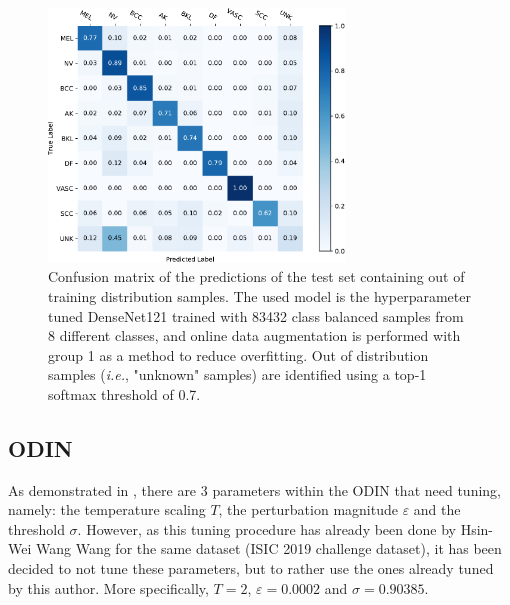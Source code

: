         \begin{figure}[ht]
            \centering
            \includegraphics[width=0.7\textwidth]{figs/densenet121_conf_matrix_thresh_0_7.pdf}
            \caption[Confusion matrix of the test set predictions on the hyperparameter tuned DenseNet121 trained with 8 classes where out of distribution samples are identified using a top-1 softmax threshold of 0.7.]{Confusion matrix of the predictions of the test set containing out of training distribution samples. The used model is the hyperparameter tuned DenseNet121 trained with 83432 class balanced samples from 8 different classes, and online data augmentation is performed with group 1 as a method to reduce overfitting. Out of distribution samples (\textit{i.e.}, "unknown" samples) are identified using a top-1 softmax threshold of 0.7.}
            \label{fig:densenet121_conf_matrix_thresh_0_7}
        \end{figure}

        
    \subsection{\ac{ODIN}}
        As demonstrated in , there are 3 parameters within the \ac{ODIN} that need tuning, namely: the temperature scaling $T$, the perturbation magnitude $\varepsilon$ and the threshold $\sigma$. However, as this tuning procedure has already been done by Hsin-Wei Wang Wang \cite{Wang} for the same dataset (\ac{ISIC} 2019 challenge dataset), it has been decided to not tune these parameters, but to rather use the ones already tuned by this author. More specifically, $T = 2$, $\varepsilon = 0.0002$ and $\sigma = 0.90385$. \par
        
